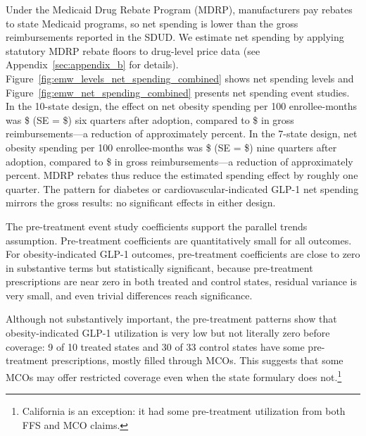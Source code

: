 Under the Medicaid Drug Rebate Program (MDRP), manufacturers pay rebates to state Medicaid programs, so net spending is lower than the gross reimbursements reported in the SDUD. We estimate net spending by applying statutory MDRP rebate floors to drug-level price data (see Appendix~\ref{sec:appendix_b} for details). Figure~\ref{fig:emw_levels_net_spending_combined} shows net spending levels and Figure~\ref{fig:emw_net_spending_combined} presents net spending event studies. In the 10-state design, the effect on net obesity spending per 100 enrollee-months was \$\netSpObTenSixEmw{} (SE = \$\netSpObTenSixEmwSE{}) six quarters after adoption, compared to \$\spObTenSixEmw{} in gross reimbursements---a reduction of approximately \spReductionObTenSixEmw{} percent. In the 7-state design, net obesity spending per 100 enrollee-months was \$\netSpObSevenNineEmw{} (SE = \$\netSpObSevenNineEmwSE{}) nine quarters after adoption, compared to \$\spObSevenNineEmw{} in gross reimbursements---a reduction of approximately \spReductionObSevenNineEmw{} percent. MDRP rebates thus reduce the estimated spending effect by roughly one quarter. The pattern for diabetes or cardiovascular-indicated GLP-1 net spending mirrors the gross results: no significant effects in either design.

The pre-treatment event study coefficients support the parallel trends assumption. Pre-treatment coefficients are quantitatively small for all outcomes. For obesity-indicated GLP-1 outcomes, pre-treatment coefficients are close to zero in substantive terms but statistically significant, because pre-treatment prescriptions are near zero in both treated and control states, residual variance is very small, and even trivial differences reach significance.

Although not substantively important, the pre-treatment patterns show that obesity-indicated GLP-1 utilization is very low but not literally zero before coverage: 9 of 10 treated states and 30 of 33 control states have some pre-treatment prescriptions, mostly filled through MCOs. This suggests that some MCOs may offer restricted coverage even when the state formulary does not.\footnote{California is an exception: it had some pre-treatment utilization from both FFS and MCO claims.}

